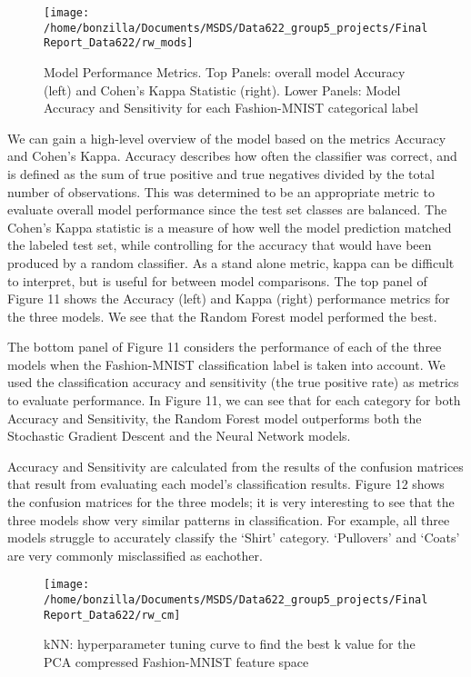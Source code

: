 \documentclass{article}
\begin{document}
\begin{figure}

{\centering \texttt{[image: /home/bonzilla/Documents/MSDS/Data622\_group5\_projects/FinalReport\_Data622/rw\_mods]} 

}

\caption{Model Performance Metrics. Top Panels: overall model Accuracy (left) and Cohen's Kappa Statistic (right). Lower Panels: Model Accuracy and Sensitivity for each Fashion-MNIST categorical label}\label{fig:unnamed-chunk-11}
\end{figure}

We can gain a high-level overview of the model based on the metrics
Accuracy and Cohen's Kappa. Accuracy describes how often the classifier
was correct, and is defined as the sum of true positive and true
negatives divided by the total number of observations. This was
determined to be an appropriate metric to evaluate overall model
performance since the test set classes are balanced. The Cohen's Kappa
statistic is a measure of how well the model prediction matched the
labeled test set, while controlling for the accuracy that would have
been produced by a random classifier. As a stand alone metric, kappa can
be difficult to interpret, but is useful for between model comparisons.
The top panel of Figure 11 shows the Accuracy (left) and Kappa (right)
performance metrics for the three models. We see that the Random Forest
model performed the best.

The bottom panel of Figure 11 considers the performance of each of the
three models when the Fashion-MNIST classification label is taken into
account. We used the classification accuracy and sensitivity (the true
positive rate) as metrics to evaluate performance. In Figure 11, we can
see that for each category for both Accuracy and Sensitivity, the Random
Forest model outperforms both the Stochastic Gradient Descent and the
Neural Network models.

Accuracy and Sensitivity are calculated from the results of the
confusion matrices that result from evaluating each model's
classification results. Figure 12 shows the confusion matrices for the
three models; it is very interesting to see that the three models show
very similar patterns in classification. For example, all three models
struggle to accurately classify the `Shirt' category. `Pullovers' and
`Coats' are very commonly misclassified as eachother.

\begin{figure}

{\centering \texttt{[image: /home/bonzilla/Documents/MSDS/Data622\_group5\_projects/FinalReport\_Data622/rw\_cm]} 

}

\caption{kNN: hyperparameter tuning curve to find the best k value for the PCA compressed Fashion-MNIST feature space}\label{fig:unnamed-chunk-12}
\end{figure}
\end{document}
